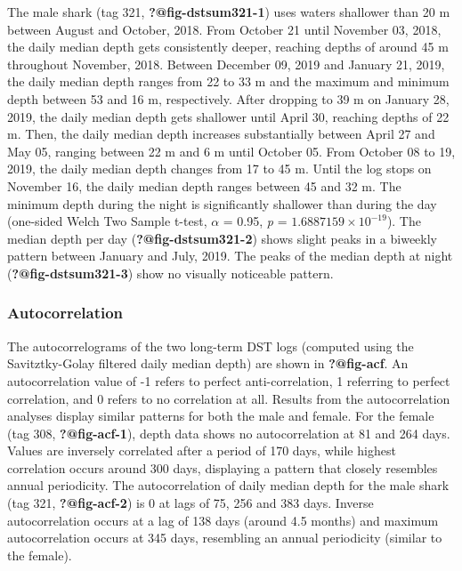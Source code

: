 \documentclass[
  authoryear,
  review,
  3p]{elsarticle}
\begin{document}
The male shark (tag 321, \textbf{?@fig-dstsum321-1}) uses waters
shallower than 20 m between August and October, 2018. From October 21
until November 03, 2018, the daily median depth gets consistently
deeper, reaching depths of around 45 m throughout November, 2018.
Between December 09, 2019 and January 21, 2019, the daily median depth
ranges from 22 to 33 m and the maximum and minimum depth between 53 and
16 m, respectively. After dropping to 39 m on January 28, 2019, the
daily median depth gets shallower until April 30, reaching depths of 22
m. Then, the daily median depth increases substantially between April 27
and May 05, ranging between 22 m and 6 m until October 05. From October
08 to 19, 2019, the daily median depth changes from 17 to 45 m. Until
the log stops on November 16, the daily median depth ranges between 45
and 32 m. The minimum depth during the night is significantly shallower
than during the day (one-sided Welch Two Sample t-test, \(\alpha\) =
0.95, \emph{p} = \ensuremath{1.6887159\times 10^{-19}}). The median
depth per day (\textbf{?@fig-dstsum321-2}) shows slight peaks in a
biweekly pattern between January and July, 2019. The peaks of the median
depth at night (\textbf{?@fig-dstsum321-3}) show no visually noticeable
pattern.

\hypertarget{sec-resacf}{%
\subsubsection{Autocorrelation}\label{sec-resacf}}

The autocorrelograms of the two long-term DST logs (computed using the
Savitztky-Golay filtered daily median depth) are shown in
\textbf{?@fig-acf}. An autocorrelation value of -1 refers to perfect
anti-correlation, 1 referring to perfect correlation, and 0 refers to no
correlation at all. Results from the autocorrelation analyses display
similar patterns for both the male and female. For the female (tag 308,
\textbf{?@fig-acf-1}), depth data shows no autocorrelation at 81 and 264
days. Values are inversely correlated after a period of 170 days, while
highest correlation occurs around 300 days, displaying a pattern that
closely resembles annual periodicity. The autocorrelation of daily
median depth for the male shark (tag 321, \textbf{?@fig-acf-2}) is 0 at
lags of 75, 256 and 383 days. Inverse autocorrelation occurs at a lag of
138 days (around 4.5 months) and maximum autocorrelation occurs at 345
days, resembling an annual periodicity (similar to the female).
\end{document}
